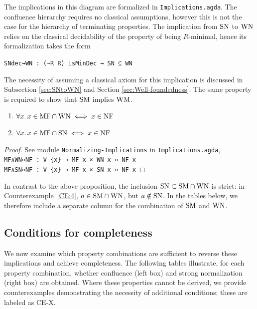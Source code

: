 The implications in this diagram are formalized in \texttt{Implications.agda}.
The confluence hierarchy requires no classical assumptions, however this is not the case for the hierarchy of terminating properties.
The implication from $\mathrm{SN}$ to $\mathrm{WN}$ relies on the classical decidability of the property
of being $R$-minimal, hence its formalization takes the form

\verb|SNdec→WN : (~R R) isMinDec → SN ⊆ WN|

The necessity of assuming a classical axiom for this implication is discussed 
in Subsection \ref{sec:SNtoWN} and
Section \ref{sec:Well-foundedness}.
The same property is required to show that $\mathrm{SM}$ implies $\mathrm{WM}$.

\begin{proposition}\label{prop:MFtoNF} \hfill
    \begin{enumerate}
        \item $\forall x.\, x\in \mathrm{MF} \cap \mathrm{WN} \iff x \in \mathrm{NF}$
        \item $\forall x.\, x\in \mathrm{MF} \cap \mathrm{SN} \iff x \in \mathrm{NF}$
    \end{enumerate}

\end{proposition}
\begin{proof}
    See module \texttt{Normalizing-Implications} in \texttt{Implications.agda},\\
    \verb|MF∧WN↔NF : ∀ {x} → MF x × WN x ↔ NF x|\\
    \verb|MF∧SN↔NF : ∀ {x} → MF x × SN x ↔ NF x| \qedhere
\end{proof}

In contrast to the above proposition, the inclusion $\mathrm{SN} \subset \mathrm{SM} \cap \mathrm{WN} $ is strict: in Counterexample~\ref{CE:4}, $a \in \mathrm{SM} \cap \mathrm{WN}$, but $a \notin \mathrm{SN}$. In the tables below, we therefore include a separate column for the combination of $\mathrm{SM}$ and $\mathrm{WN}$.
\subsection{Conditions for completeness}\label{subsec:counterexamples}


We now examine which property combinations are sufficient to reverse these implications and achieve completeness. The following tables illustrate, for each property combination, whether confluence (left box) and strong normalization (right box) are obtained. Where these properties cannot be derived, we provide counterexamples demonstrating the necessity of additional conditions; these are labeled as CE-X.

